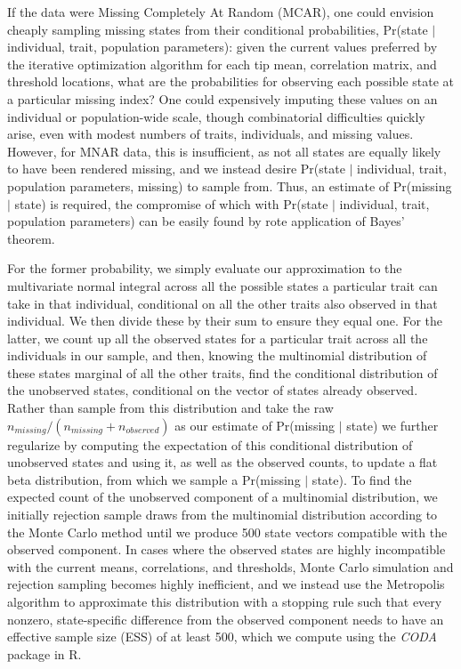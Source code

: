 \documentclass[12pt, twocolumn, twoside]{article}
\begin{document}
If the data were Missing Completely At Random (MCAR), one could envision cheaply sampling missing states from their conditional probabilities, Pr(state $\vert$ individual, trait, population parameters): given the current values preferred by the iterative optimization algorithm for each tip mean, correlation matrix, and threshold locations, what are the probabilities for observing each possible state at a particular missing index? One could expensively imputing these values on an individual or population-wide scale, though combinatorial difficulties quickly arise, even with modest numbers of traits, individuals, and missing values. However, for MNAR data, this is insufficient, as not all states are equally likely to have been rendered missing, and we instead desire Pr(state $\vert$ individual, trait, population parameters, missing) to sample from. Thus, an estimate of Pr(missing $\vert$ state) is required, the compromise of which with Pr(state $\vert$ individual, trait, population parameters) can be easily found by rote application of Bayes' theorem.

For the former probability, we simply evaluate our approximation to the multivariate normal integral across all the possible states a particular trait can take in that individual, conditional on all the other traits also observed in that individual. We then divide these by their sum to ensure they equal one. For the latter, we count up all the observed states for a particular trait across all the individuals in our sample, and then, knowing the multinomial distribution of these states marginal of all the other traits, find the conditional distribution of the unobserved states, conditional on the vector of states already observed. Rather than sample from this distribution and take the raw $n_{missing} / (n_{missing} + n_{observed})$ as our estimate of Pr(missing $\vert$ state) we further regularize by computing the expectation of this conditional distribution of  unobserved states and using it, as well as the observed counts, to update a flat beta distribution, from which we sample a Pr(missing $\vert$ state). To find the expected count of the unobserved component of a multinomial distribution, we initially rejection sample draws from the multinomial distribution according to the Monte Carlo method until we produce 500 state vectors compatible with the observed component. In cases where the observed states are highly incompatible with the current means, correlations, and thresholds, Monte Carlo simulation and rejection sampling becomes highly inefficient, and we instead use the Metropolis algorithm to approximate this distribution with a stopping rule such that every nonzero, state-specific difference from the observed component needs to have an effective sample size (ESS) of at least 500, which we compute using the \textit{CODA} package \citep{plummerCODAConvergenceDiagnosis2006} in R.
\end{document}
